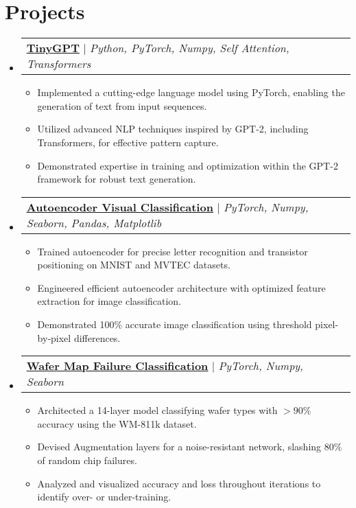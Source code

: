 \documentclass[letterpaper,11pt]{article}
\makeatletter
\newcommand{\resumeItem}[1]{
  \item\small{
    {#1 \vspace{-2pt}}
  }
}
\newcommand{\resumeProjectHeading}[2]{
    \item
    \begin{tabular*}{0.97\textwidth}{l@{\extracolsep{\fill}}r}
      \small#1 & #2 \\
    \end{tabular*}\vspace{-7pt}
}
\newcommand{\resumeSubHeadingListStart}{\begin{itemize}[leftmargin=0.15in, label={}]}
\newcommand{\resumeSubHeadingListEnd}{\end{itemize}}
\newcommand{\resumeItemListStart}{\begin{itemize}}
\newcommand{\resumeItemListEnd}{\end{itemize}\vspace{-5pt}}
\makeatother
\begin{document}
\section{Projects}
    \resumeSubHeadingListStart
        \resumeProjectHeading
          {\href{https://github.com/JNewman-cell/tinyGPT}{\underline{\textbf{TinyGPT}}} $|$ \emph{Python, PyTorch, Numpy, Self Attention, Transformers}}{}
          \resumeItemListStart
            \resumeItem{Implemented a cutting-edge language model using PyTorch, enabling the generation of text from input sequences.}
            \resumeItem{Utilized advanced NLP techniques inspired by GPT-2, including Transformers, for effective pattern capture.}
            \resumeItem{Demonstrated expertise in training and optimization within the GPT-2 framework for robust text generation.}
          \resumeItemListEnd
        \resumeProjectHeading
          {\href{https://github.com/JNewman-cell/AutoencoderClassfication}{\underline{\textbf{Autoencoder Visual Classification}}}
          $|$ \emph{PyTorch, Numpy, Seaborn, Pandas, Matplotlib}}{}
          \resumeItemListStart
            \resumeItem{Trained autoencoder for precise letter recognition and transistor positioning on MNIST and MVTEC datasets.}
            \resumeItem{Engineered efficient autoencoder architecture with optimized feature extraction for image classification.}
            \resumeItem{Demonstrated 100\% accurate image classification using threshold pixel-by-pixel differences.}
          \resumeItemListEnd
        \resumeProjectHeading
          {\href{https://github.com/JNewman-cell/WaferMapNeuralNetworkClassification}{\underline{\textbf{Wafer Map Failure Classification}}}
          $|$ \emph{PyTorch, Numpy, Seaborn}}{}
          \resumeItemListStart
            \resumeItem{Architected a 14-layer model classifying wafer types with $>90\%$ accuracy using the WM-811k dataset.}
            \resumeItem{Devised Augmentation layers for a noise-resistant network, slashing 80\% of random chip failures.}
            \resumeItem{Analyzed and visualized accuracy and loss throughout iterations to identify over- or under-training.}
          \resumeItemListEnd
    \resumeSubHeadingListEnd



%
\end{document}
